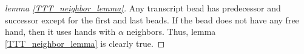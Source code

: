 \documentclass[runningheads]{llncs}
\begin{document}
%      
%      
%
%






\begin{proof}[lemma \ref{TTT_neighbor_lemma}]
Any transcript bead has predecessor and successor except for the first and last beads. If the bead does not have any free hand, then it uses hands with $\alpha$ neighbors. Thus, lemma \ref{TTT_neighbor_lemma} is clearly true.
\end{proof}
\end{document}
